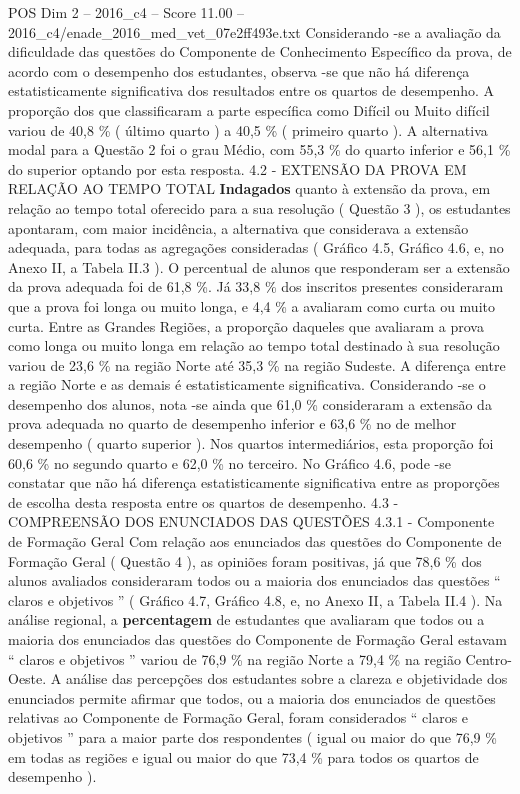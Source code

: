 \begin{textsample}{POS Dim 2 – 2016\_c4 – Score 11.00 – 2016\_c4/enade\_2016\_med\_vet\_07e2ff493e.txt}
Considerando -se a avaliação da dificuldade das questões do Componente de Conhecimento Específico da prova, de acordo com o desempenho dos estudantes, observa -se que não há diferença estatisticamente significativa dos resultados entre os quartos de desempenho.
A proporção dos que classificaram a parte específica como Difícil ou Muito difícil variou de 40,8 \% ( último quarto ) a 40,5 \% ( primeiro quarto ).
A alternativa modal para a Questão 2 foi o grau Médio, com 55,3 \% do quarto inferior e 56,1 \% do superior optando por esta resposta. 4.2 - EXTENSÃO DA PROVA EM RELAÇÃO AO TEMPO TOTAL \textbf{Indagados} quanto à extensão da prova, em relação ao tempo total oferecido para a sua resolução ( Questão 3 ), os estudantes apontaram, com maior incidência, a alternativa que considerava a extensão adequada, para todas as agregações consideradas ( Gráfico 4.5, Gráfico 4.6, e, no Anexo II, a Tabela II.3 ).
O percentual de alunos que responderam ser a extensão da prova adequada foi de 61,8 \%.
Já 33,8 \% dos inscritos presentes consideraram que a prova foi longa ou muito longa, e 4,4 \% a avaliaram como curta ou muito curta.
Entre as Grandes Regiões, a proporção daqueles que avaliaram a prova como longa ou muito longa em relação ao tempo total destinado à sua resolução variou de 23,6 \% na região Norte até 35,3 \% na região Sudeste.
A diferença entre a região Norte e as demais é estatisticamente significativa.
Considerando -se o desempenho dos alunos, nota -se ainda que 61,0 \% consideraram a extensão da prova adequada no quarto de desempenho inferior e 63,6 \% no de melhor desempenho ( quarto superior ).
Nos quartos intermediários, esta proporção foi 60,6 \% no segundo quarto e 62,0 \% no terceiro.
No Gráfico 4.6, pode -se constatar que não há diferença estatisticamente significativa entre as proporções de escolha desta resposta entre os quartos de desempenho. 4.3 - COMPREENSÃO DOS ENUNCIADOS DAS QUESTÕES 4.3.1 - Componente de Formação Geral Com relação aos enunciados das questões do Componente de Formação Geral ( Questão 4 ), as opiniões foram positivas, já que 78,6 \% dos alunos avaliados consideraram todos ou a maioria dos enunciados das questões “ claros e objetivos ” ( Gráfico 4.7, Gráfico 4.8, e, no Anexo II, a Tabela II.4 ).
Na análise regional, a \textbf{percentagem} de estudantes que avaliaram que todos ou a maioria dos enunciados das questões do Componente de Formação Geral estavam “ claros e objetivos ” variou de 76,9 \% na região Norte a 79,4 \% na região Centro-Oeste.
A análise das percepções dos estudantes sobre a clareza e objetividade dos enunciados permite afirmar que todos, ou a maioria dos enunciados de questões relativas ao Componente de Formação Geral, foram considerados “ claros e objetivos ” para a maior parte dos respondentes ( igual ou maior do que 76,9 \% em todas as regiões e igual ou maior do que 73,4 \% para todos os quartos de desempenho ).

\end{textsample}
